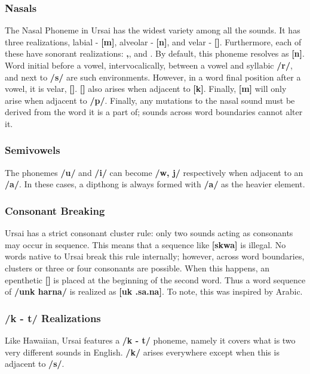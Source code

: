 \documentclass[11pt,letterpaper]{article}
\newcommand{\epsi}{\textipa{E}}
\newcommand{\engma}{\textipa{N}}
\newcommand{\nson}{\s{n}}
\newcommand{\mson}{\s{m}}
\newcommand{\engson}{\s{\engma}}
\begin{document}
		\subsubsection{Nasals}\label{nasal}
		\par
		The Nasal Phoneme in Ursai has the widest variety among all the sounds.  It has three realizations, labial - \textbf{[m]}, alveolar - \textbf{[n]}, and velar - \textbf{[\engma]}.  Furthermore, each of these have sonorant realizations: \textbf{\mson ,\space\nson}, and \textbf{\engson}.  By default, this phoneme resolves as \textbf{[n]}.  Word initial before a vowel, intervocalically, between a vowel and syllabic \textbf{/r/}, and next to \textbf{/s/} are such environments.  However, in a word final position after a vowel, it is velar, \textbf{[\engma]}.  \textbf{[\engma]} also arises when adjacent to \textbf{[k]}.  Finally, \textbf{[m]} will only arise when adjacent to \textbf{/p/}.  Finally, any mutations to the nasal sound must be derived from the word it is a part of; sounds across word boundaries cannot alter it.
		\subsubsection{Semivowels}\label{semivowel}
		\par
		The phonemes \textbf{/u/} and \textbf{/i/} can become \textbf{/w, j/} respectively when adjacent to an \textbf{/a/}.  In these cases, a dipthong is always formed with \textbf{/a/} as the heavier element.
		\subsubsection{Consonant Breaking}\label{breaking}
		\par
		Ursai has a strict consonant cluster rule: only two sounds acting as consonants may occur in sequence.  This means that a sequence like \textbf{[skwa]} is illegal.  No words native to Ursai break this rule internally; however, across word boundaries, clusters or three or four consonants are possible.  When this happens, an epenthetic \textbf{[\epsi]} is placed at the beginning of the second word.  Thus a word sequence of \textbf{/unk harna/} is realized as \textbf{[u\engma k \epsi .sa\textrhoticity .na]}.  To note, this was inspired by Arabic\cite{ArabicPhonology}.
		\subsubsection{/k - t/ Realizations}
		\par
		Like Hawaiian\cite{HawaiianPhonology}, Ursai features a \textbf{/k - t/} phoneme, namely it covers what is two very different sounds in English.  \textbf{/k/} arises everywhere except when this is adjacent to \textbf{/s/}.
\end{document}

